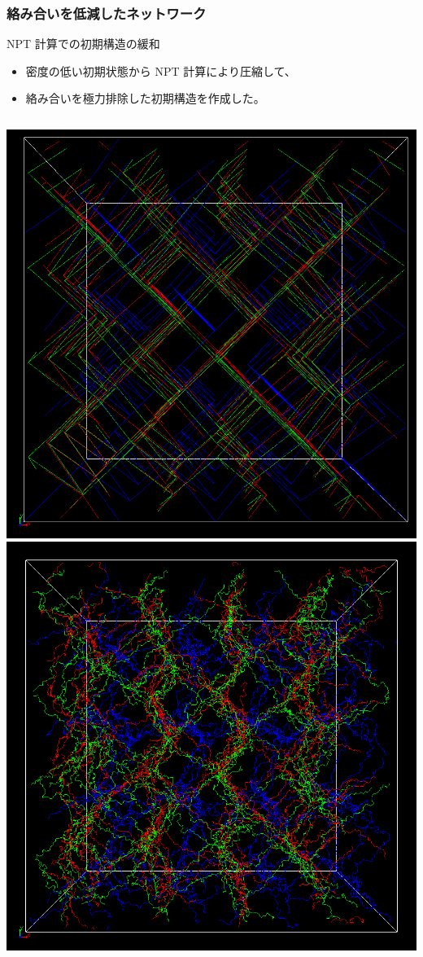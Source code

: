 \documentclass[12pt, dvipdfmx]{beamer}
\begin{document}
\begin{frame}
	\frametitle{絡み合いを低減したネットワーク}
		\begin{exampleblock}{NPT 計算での初期構造の緩和}
			\begin{itemize}
				\item \alert{密度の低い初期状態}から NPT 計算により圧縮して、
				\item 絡み合いを極力排除した初期構造を作成した。
			\end{itemize}
		\end{exampleblock}

		\begin{columns}[T, onlytextwidth]
				\includegraphics[width=.9\textwidth]{NPT_00.png}
				\includegraphics[width=.9\textwidth]{NPT_11.png}
		\end{columns}
\end{frame}
\end{document}
